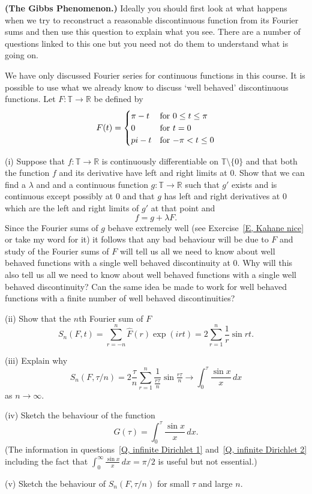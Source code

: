 \begin{question}{\bf (The Gibbs Phenomenon.)}\label{E, Gibbs}
Ideally you should first look at what happens
when we try to reconstruct a reasonable
discontinuous function from its Fourier sums
and then use this question to explain what you see.
There are a number of questions linked to this one
but you need not do them to understand what is going on.

We have only discussed Fourier
series for continuous functions in this course.
It is possible to use what we already know
to discuss `well behaved' discontinuous
functions. Let $F:{\mathbb T}\rightarrow{\mathbb R}$
be defined by
\begin{equation*}
F(t)=
\begin{cases}
\pi-t&\text{for $0\leq t\leq\pi$}\\
0&\text{for $t=0$}\\
\-pi-t&\text{for $-\pi<t\leq 0$}
\end{cases}
\end{equation*}

(i) Suppose that  $f:{\mathbb T}\rightarrow{\mathbb R}$
is continuously differentiable
on ${\mathbb T}\setminus\{0\}$ and that both the
function $f$ and its derivative have left and right
limits at $0$. Show that we can find a $\lambda$
and  and a
continuous function $g:{\mathbb T}\rightarrow{\mathbb R}$
such that $g'$ exists and is continuous
except possibly at $0$ and that
$g$ has left and right derivatives at $0$ which
are the left and right limits of $g'$ at that point
and
\[f=g+\lambda F.\]
Since the Fourier sums of $g$ behave extremely well
(see Exercise~\ref{E, Kahane nice} or take my word for it)
it follows that any bad behaviour will be due to $F$
and study of the Fourier sums of $F$ will tell us all
we need to know about well behaved functions with a
single well behaved discontinuity at $0$. Why
will this also tell us all
we need to know about well behaved functions with a
single well behaved discontinuity? Can the same
idea be made to work for well behaved functions with a
finite number of well behaved discontinuities?

(ii) Show that the $n$th Fourier sum of $F$
\[S_{n}(F,t)=\sum_{r=-n}^{n}\hat{F}(r)\exp(irt)
=2\sum_{r=1}^{n}\frac{1}{r}\sin rt.\]

(iii) Explain why
\[S_{n}(F,\tau/n)
=2\frac{\tau}{n}\sum_{r=1}^{n}\frac{1}{\tfrac{r\tau}{n}}
\sin\tfrac{r\tau}{n}\rightarrow\int_{0}^{\tau}\frac{\sin x}{x}\,dx\]
as $n\rightarrow\infty$.

(iv) Sketch the behaviour of the function
\[G(\tau)=\int_{0}^{\tau}\frac{\sin x}{x}\,dx.\]
(The information in questions~\ref{Q, infinite Dirichlet 1}
and~\ref{Q, infinite Dirichlet 2} including the fact that
$\int_{0}^{\infty}\frac{\sin x}{x}\,dx=\pi/2$ is useful
but not essential.)

(v) Sketch the behaviour of $S_{n}(F,\tau/n)$ for small
$\tau$ and large $n$.

\end{question}
